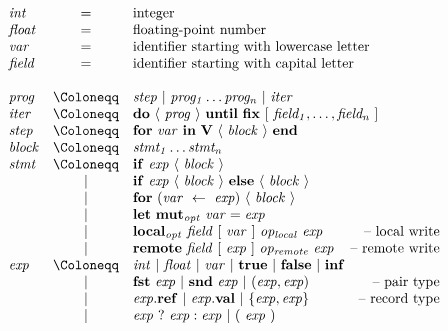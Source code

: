 \documentclass{sokendai_thesis} %
\newcommand{\hsp}[1]{\hspace{-3em}\hbox{#1}}
\begin{document}
\begin{figure}[t]
\normalsize
\[
\begin{array}{lclr}
\mathit{int} & = & \hbox{integer} \\
\mathit{float} & = & \hbox{floating-point number} \\
\mathit{var} & = & \hbox{identifier starting with lowercase letter} \\
\mathit{field} & = & \hbox{identifier starting with capital letter} \\
\\
\mathit{prog}  & \Coloneqq & \mathit{step}~|~\mathit{prog_1}\ldots\mathit{prog_n}~|~\mathit{iter} \\
\mathit{iter} & \Coloneqq & \mathbf{do}~\langle~\mathit{prog}~\rangle~\mathbf{until}~\mathbf{fix}~[~\mathit{field_1},\ldots,\mathit{field_n}~] \\
\mathit{step}& \Coloneqq & \mathbf{for}~\mathit{var}~\mathbf{in}~\mathbf{V}~\langle~\mathit{block}~\rangle~\mathbf{end} \\
\mathit{block} & \Coloneqq & \mathit{stmt_1} \ldots \mathit{stmt_n} \\
\mathit{stmt}  & \Coloneqq & \mathbf{if}~\mathit{exp}~\langle~\mathit{block}~\rangle \\
 & | & \mathbf{if}~\mathit{exp}~\langle~\mathit{block}~\rangle~\mathbf{else}~\langle~\mathit{block}~\rangle \\
 & | & \mathbf{for}~(\mathit{var}~\leftarrow~\mathit{exp})~\langle~\mathit{block}~\rangle \\
 & | & \mathbf{let}~\mathbf{mut}\mathit{_{opt}}~\mathit{var}=\mathit{exp} \\
 & | & \mathbf{local}\mathit{_{opt}}~\mathit{field}~[~\mathit{var}~]~\mathit{op_{local}}~\mathit{exp} & \hsp{-- local write} \\
 & | & \mathbf{remote}~\mathit{field}~[~\mathit{exp}~]~\mathit{op_{remote}}~\mathit{exp} & \hsp{-- remote write} \\
\mathit{exp}   & \Coloneqq & \mathit{int}~|~\mathit{float}~|~\mathit{var}~|~\mathbf{true}~|~\mathbf{false}~|~\mathbf{inf} \\
 & | & \mathbf{fst}~\mathit{exp}~|~\mathbf{snd}~\mathit{exp}~|~(\mathit{exp},\mathit{exp}) & \hsp{-- pair type} \\
 & | & \mathit{exp}.\mathbf{ref}~|~\mathit{exp}.\mathbf{val}~|~\{\mathit{exp},\mathit{exp}\} & \hsp{-- record type} \\
 & | & \mathit{exp}~?~\mathit{exp}:\mathit{exp}~|~(~\mathit{exp}~) \\

\end{array}\]
\end{figure}
\end{document}
